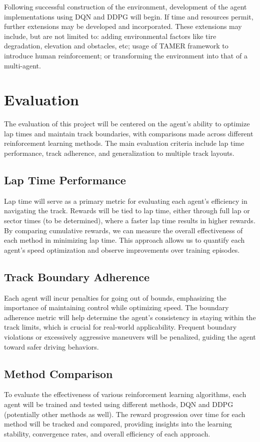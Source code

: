 \documentclass{article}
\begin{document}
Following successful construction of the environment, development of the agent implementations using DQN and DDPG will begin. If time and resources permit, further extensions may be developed and incorporated. These extensions may include, but are not limited to: adding environmental factors like tire degradation, elevation and obstacles, etc; usage of TAMER framework to introduce human reinforcement; or transforming the environment into that of a multi-agent. 

\section{Evaluation}

The evaluation of this project will be centered on the agent’s ability to optimize lap times and maintain track boundaries, with comparisons made across different reinforcement learning methods. The main evaluation criteria include lap time performance, track adherence, and generalization to multiple track layouts.

\subsection{Lap Time Performance}
Lap time will serve as a primary metric for evaluating each agent’s efficiency in navigating the track. Rewards will be tied to lap time, either through full lap or sector times (to be determined), where a faster lap time results in higher rewards. By comparing cumulative rewards, we can measure the overall effectiveness of each method in minimizing lap time. This approach allows us to quantify each agent’s speed optimization and observe improvements over training episodes.

\subsection{Track Boundary Adherence}
Each agent will incur penalties for going out of bounds, emphasizing the importance of maintaining control while optimizing speed. The boundary adherence metric will help determine the agent’s consistency in staying within the track limits, which is crucial for real-world applicability. Frequent boundary violations or excessively aggressive maneuvers will be penalized, guiding the agent toward safer driving behaviors.

\subsection{Method Comparison}
To evaluate the effectiveness of various reinforcement learning algorithms, each agent will be trained and tested using different methods, DQN and DDPG (potentially other methods as well). The reward progression over time for each method will be tracked and compared, providing insights into the learning stability, convergence rates, and overall efficiency of each approach.
\end{document}
